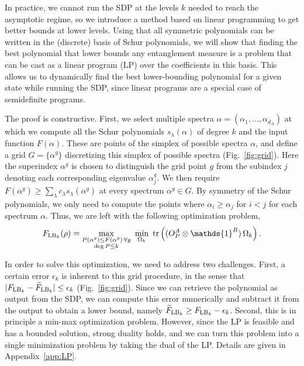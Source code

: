 \documentclass[11pt,a4paper]{report}
\newcommand{\one}{\mathds{1}}
\newcommand{\I}{\one}
\renewcommand{\a}{\alpha}
\begin{document}
In practice, we cannot run the SDP at the levels $k$ needed to reach the asymptotic regime, so we introduce a method based on linear programming to get better bounds at lower levels.
Using that all symmetric polynomials can be written in the (discrete) basis of Schur polynomials, we will show that finding the best polynomial that lower bounds any entanglement measure is a problem that can be cast as a linear program (LP) over the coefficients in this basis. This allows us to dynamically find the best lower-bounding polynomial for a given state while running the SDP, since linear programs are a special case of semidefinite programs.

The proof is constructive. First, we select multiple spectra $\a=(\a_1, \dots, \a_{d_A})$ at which we compute all the Schur polynomials $s_\lambda(\a)$ of degree $k$ and the input function $F(\a)$. These are points of the simplex of possible spectra $\alpha$, and define a grid $G=\{\a^g\}$ discretizing this simplex of possible spectra (Fig.~\ref{fig:grid}). Here the superindex $\a^g$ is chosen to distinguish the grid point $g$ from the subindex $j$ denoting each corresponding eigenvalue $\a^g_j$. We then require $F(\a^g) \geq \sum_\lambda c_\lambda s_\lambda(\a^g)$ at every spectrum $\a^g\in G$. By symmetry of the Schur polynomials, we only need to compute the points where $\a_i \geq \a_j$ for $i < j$ for each spectrum $\a$.
Thus, we are left with the following optimization problem,
\begin{equation}\label{eq:FLBgrid}
    F_{{\rm LB}_k}(\rho)=\max_{\substack{P(\a^g)\leq F(\a^g)\,\forall g\\ \deg P\leq k}}\ \min_{\Omega_k}\ \tr\left((O_P^A\otimes\I^B)\,\Omega_k\right).
\end{equation}

In order to solve this optimization, we need to address two challenges. First, a certain error $\epsilon_k$ is inherent to this grid procedure, in the sense that $|F_{{\rm LB}_k}-\widetilde{F}_{{\rm LB}_k}|\leq \epsilon_k$ (Fig.~\ref{fig:grid}).
Since we can retrieve the polynomial as output from the SDP, we can compute this error numerically and subtract it from the output to obtain a lower bound, namely $\widetilde{F}_{{\rm LB}_k}\geq F_{{\rm LB}_k} - \epsilon_k$. Second, this is in principle a min-max optimization problem. However, since the LP is feasible and has a bounded solution, strong duality holds, and we can turn this problem into a single minimization problem by taking the dual of the LP. Details are given in Appendix~\ref{app:LP}.
\end{document}
